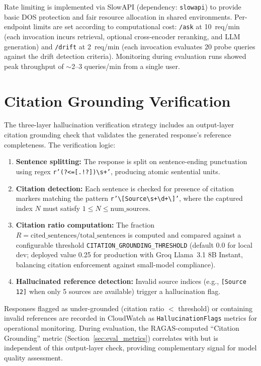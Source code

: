 Rate limiting is implemented via SlowAPI (dependency: \texttt{slowapi}) to provide basic DOS protection and fair resource allocation in shared environments. Per-endpoint limits are set according to computational cost: \texttt{/ask} at 10~req/min (each invocation incurs retrieval, optional cross-encoder reranking, and LLM generation) and \texttt{/drift} at 2~req/min (each invocation evaluates 20 probe queries against the drift detection criteria). Monitoring during evaluation runs showed peak throughput of $\sim$2--3 queries/min from a single user.

\section{Citation Grounding Verification}
\label{sec:citation_grounding}

The three-layer hallucination verification strategy includes an output-layer citation grounding check that validates the generated response's reference completeness. The verification logic:

\begin{enumerate}[leftmargin=0.5in]
  \item \textbf{Sentence splitting:} The response is split on sentence-ending punctuation using regex \texttt{r'(?<=[.!?]){\textbackslash}s+'}, producing atomic sentential units.
  
  \item \textbf{Citation detection:} Each sentence is checked for presence of citation markers matching the pattern \texttt{r'{\textbackslash}[Source{\textbackslash}s+{\textbackslash}d+{\textbackslash}]'}, where the captured index $N$ must satisfy $1 \leq N \leq \text{num\_sources}$.
  
  \item \textbf{Citation ratio computation:} The fraction $R = \text{cited\_sentences} / \text{total\_sentences}$ is computed and compared against a configurable threshold \texttt{CITATION\_GROUNDING\_THRESHOLD} (default 0.0 for local dev; deployed value 0.25 for production with Groq Llama~3.1 8B Instant, balancing citation enforcement against small-model compliance).
  
  \item \textbf{Hallucinated reference detection:} Invalid source indices (e.g., \texttt{[Source 12]} when only 5 sources are available) trigger a hallucination flag.
\end{enumerate}

Responses flagged as under-grounded (citation ratio $< $ threshold) or containing invalid references are recorded in CloudWatch as \texttt{HallucinationFlags} metrics for operational monitoring. During evaluation, the RAGAS-computed ``Citation Grounding'' metric (Section~\ref{sec:eval_metrics}) correlates with but is independent of this output-layer check, providing complementary signal for model quality assessment.


